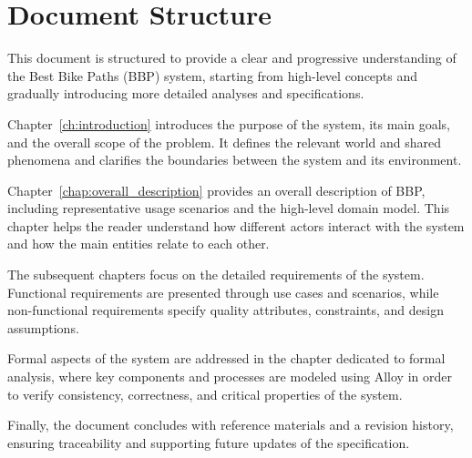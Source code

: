 \section{Document Structure}
\label{sec:document-structure}%

\par
This document is structured to provide a clear and progressive understanding of the Best Bike Paths (BBP) system,
starting from high-level concepts and gradually introducing more detailed analyses and specifications.

\par
Chapter~\ref{ch:introduction} introduces the purpose of the system, its main goals, and the overall scope of the problem.
It defines the relevant world and shared phenomena and clarifies the boundaries between the system and its environment.

\par
Chapter~\ref{chap:overall_description} provides an overall description of BBP, including representative usage scenarios
and the high-level domain model. This chapter helps the reader understand how different actors interact with the system
and how the main entities relate to each other.

\par
The subsequent chapters focus on the detailed requirements of the system. Functional requirements are presented
through use cases and scenarios, while non-functional requirements specify quality attributes, constraints,
and design assumptions.

\par
Formal aspects of the system are addressed in the chapter dedicated to formal analysis, where key components and
processes are modeled using Alloy in order to verify consistency, correctness, and critical properties of the system.

\par
Finally, the document concludes with reference materials and a revision history, ensuring traceability and supporting
future updates of the specification.